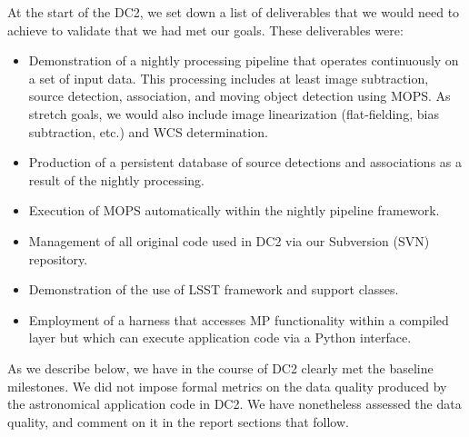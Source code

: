 At the start of the DC2, we set down a list of deliverables that we
would need to achieve to validate that we had met our goals.  These
deliverables were:
\begin{itemize}
\item Demonstration of a nightly processing pipeline that operates
  continuously on a set of input data. This processing includes at
  least image subtraction, source detection, association, and moving
  object detection using MOPS. As stretch goals, we would also include
  image linearization (flat-fielding, bias subtraction, etc.) and WCS
  determination.
\item Production of a persistent database of source detections and
  associations as a result of the nightly processing. 
\item Execution of MOPS automatically within the nightly pipeline framework.
\item Management of all original code used in DC2 via our
  Subversion (SVN) repository.
\item Demonstration of the use of LSST framework and support classes.
\item Employment of a harness that accesses MP functionality within a
  compiled layer but which can execute application code via a Python
  interface. 
\end{itemize}

As we describe below, we have in the course of DC2 clearly met the baseline
milestones.  We did not impose formal metrics on the data quality
produced by the astronomical application code in DC2.  We have
nonetheless assessed the data quality, and comment on it in the report sections
that follow.

